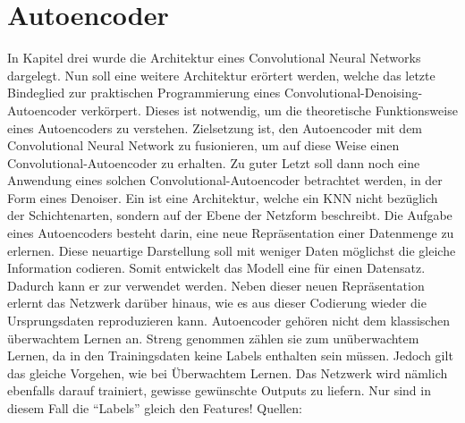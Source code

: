 \chapter{Autoencoder}\label{sec:autoencoder}
In Kapitel drei wurde die Architektur eines Convolutional Neural Networks dargelegt.
Nun soll eine weitere Architektur erörtert werden, welche das letzte Bindeglied zur
praktischen Programmierung eines Convolutional-Denoising-Autoencoder verkörpert.
Dieses ist notwendig, um die theoretische Funktionsweise eines Autoencoders zu verstehen.
Zielsetzung ist, den Autoencoder mit dem Convolutional
Neural Network zu fusionieren, um auf diese Weise einen
Convolutional-Autoencoder zu erhalten. Zu
guter Letzt soll dann noch eine Anwendung eines solchen
Convolutional-Autoencoder betrachtet werden, in der Form eines Denoiser.
\para{}
\bigskip
Ein  ist eine Architektur, welche ein KNN nicht
bezüglich der Schichtenarten, sondern auf der Ebene der Netzform beschreibt.
Die Aufgabe eines Autoencoders besteht darin, eine neue Repräsentation einer Datenmenge
zu erlernen. Diese neuartige Darstellung soll mit weniger Daten möglichst die gleiche
Information codieren. Somit entwickelt das Modell eine  für einen Datensatz. Dadurch kann er zur
 verwendet werden.
Neben dieser neuen Repräsentation erlernt das Netzwerk darüber hinaus, wie es
aus dieser Codierung wieder die Ursprungsdaten reproduzieren kann.
\para{}
Autoencoder gehören nicht dem klassischen überwachtem Lernen an. Streng genommen
zählen sie zum unüberwachtem Lernen, da in den Trainingsdaten keine Labels
enthalten sein müssen. Jedoch gilt das gleiche Vorgehen, wie bei Überwachtem Lernen.
Das Netzwerk wird nämlich ebenfalls darauf trainiert, gewisse gewünschte Outputs
zu liefern. Nur sind in diesem Fall die ``Labels'' gleich den Features!
\para{}
Quellen: \cite{book:autoencoder}

